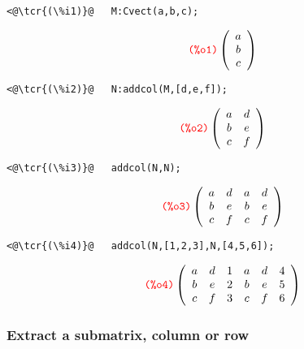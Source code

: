 \documentclass[../Maxima_Workbook.tex]{subfiles}
\begin{document}
\lz \begin{small}
\color{blue}
\begin{lstlisting}
<@\tcr{(\%i1)}@   M:Cvect(a,b,c);
\end{lstlisting}
\vspace{-6mm} \[\tag*{\tcr{\ttfamily (\%o1)}} \left( \begin{array} {c} a \\ b \\ c \end{array} \right) \]
\vspace{-6mm} \begin{lstlisting}
<@\tcr{(\%i2)}@   N:addcol(M,[d,e,f]);
\end{lstlisting}
\vspace{-6mm} \[\tag*{\tcr{\ttfamily (\%o2)}} \left( \begin{array} {cc} a & d \\ b & e \\ c & f \end{array} \right) \]
\vspace{-6mm} \begin{lstlisting}
<@\tcr{(\%i3)}@   addcol(N,N);
\end{lstlisting}
\vspace{-6mm} \[\tag*{\tcr{\ttfamily (\%o3)}} \left( \begin{array} {cccc} a & d & a & d \\ b & e & b & e\\ c & f & c & f \end{array} \right) \]
\vspace{-5mm} \begin{lstlisting}
<@\tcr{(\%i4)}@   addcol(N,[1,2,3],N,[4,5,6]);
\end{lstlisting}
\vspace{-4mm} \[\tag*{\tcr{\ttfamily (\%o4)}} \left( \begin{array} {cccccc} a & d & 1 & a & d & 4 \\ b & e & 2 & b & e & 5 \\ c & f & 3 & c & f & 6 \end{array} \right) \]
\color{black}
\end{small} \vspace{-4mm} 

\subsubsection{Extract a submatrix, column or row}
\end{document}
